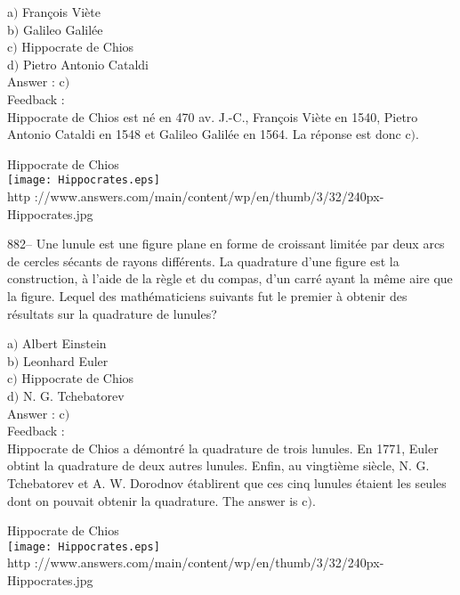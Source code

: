 ﻿\documentclass[letterpaper, 12pt]{article}
\begin{document}
a$)$ Fran\c cois Vi\`ete \\
b$)$ Galileo Galil\'ee \\
c$)$ Hippocrate de Chios \\
d$)$ Pietro Antonio Cataldi\\

Answer : c$)$\\

Feedback : \\
Hippocrate de Chios est n\'e en 470 av. J.-C., Fran\c cois Vi\`ete
en 1540,
Pietro Antonio Cataldi en 1548 et Galileo Galil\'ee en 1564. La r\'eponse
est donc c$)$.\\

        \begin{center}
        Hippocrate de Chios\\
    \texttt{[image: Hippocrates.eps]}\\
        {\footnotesize http
://www.answers.com/main/content/wp/en/thumb/3/32/240px-Hippocrates.jpg}
    \end{center}

882-- Une lunule est une figure plane en forme de croissant
limit\'ee par deux arcs de cercles s\'ecants de rayons diff\'erents.
La quadrature d'une figure est la construction, \`a l'aide de la
r\`egle et du compas, d'un carr\'e ayant la m\^eme aire que la
figure. Lequel des math\'ematiciens suivants fut le premier \`a
obtenir des r\'esultats sur la quadrature de lunules?

a$)$ Albert Einstein \\
b$)$ Leonhard Euler \\
c$)$ Hippocrate de Chios \\
d$)$ N. G. Tchebatorev \\

Answer : c$)$\\

Feedback : \\
Hippocrate de Chios a d\'emontr\'e la quadrature de trois lunules. En 1771,
Euler obtint la quadrature de deux autres lunules. Enfin, au vingti\`eme
si\`ecle, N. G. Tchebatorev et
A. W. Dorodnov \'etablirent que ces cinq lunules \'etaient les seules dont
on pouvait obtenir la quadrature. The answer is c$)$.\\

        \begin{center}
        Hippocrate de Chios\\
    \texttt{[image: Hippocrates.eps]}\\
        {\footnotesize http
://www.answers.com/main/content/wp/en/thumb/3/32/240px-Hippocrates.jpg}
    \end{center}
\end{document}
